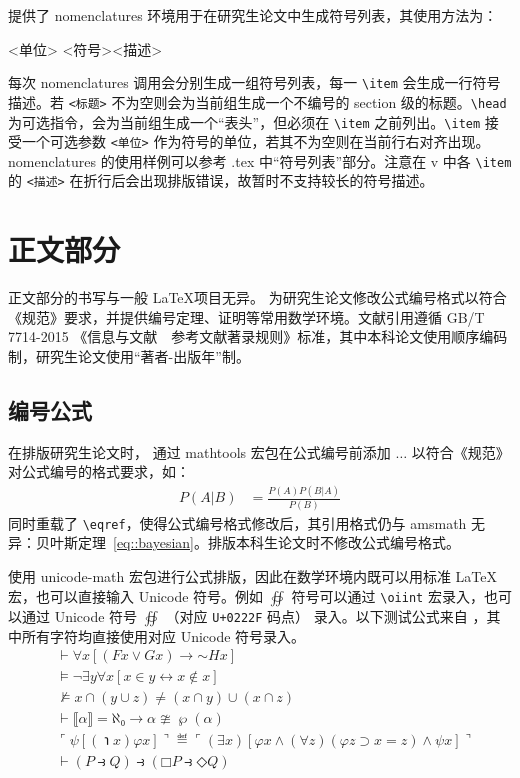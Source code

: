 \documentclass[master]{shtthesis}
\begin{document}
\shtthesis{} 提供了 nomenclatures 环境用于在研究生论文中生成符号列表，其使用方法为：
\begin{latex}
\begin{nomenclatures}[<标题>]
  \item[<单位>]{<符号>}{<描述>}
\end{nomenclatures}
\end{latex}
每次 nomenclatures 调用会分别生成一组符号列表，每一 \verb|\item| 会生成一行符号描述。若 \verb|<标题>| 不为空则会为当前组生成一个不编号的 section 级的标题。\verb|\head| 为可选指令，会为当前组生成一个“表头”，但必须在 \verb|\item| 之前列出。\verb|\item| 接受一个可选参数 \verb|<单位>| 作为符号的单位，若其不为空则在当前行右对齐出现。nomenclatures 的使用样例可以参考 \jobname.tex 中“符号列表”部分。注意在 \shtthesis{} v\version{} 中各 \verb|\item| 的 \verb|<描述>| 在折行后会出现排版错误，故暂时不支持较长的符号描述。

\section{正文部分}
\shtthesis{} 正文部分的书写与一般 \LaTeX 项目无异。\shtthesis{} 为研究生论文修改公式编号格式以符合《规范》要求，并提供编号定理、证明等常用数学环境。文献引用遵循 GB/T 7714-2015 《信息与文献　参考文献著录规则》标准，其中本科论文使用顺序编码制，研究生论文使用“著者-出版年”制。

\subsection{编号公式}
在排版研究生论文时，\shtthesis{} 通过 \textsf{mathtools} 宏包在公式编号前添加 $\ldots$ 以符合《规范》对公式编号的格式要求，如：
\begin{align}
P(A|B) &= \frac{P(A)P(B|A)}{P(B)} \label{eq::bayesian}
\end{align}
同时重载了 \verb|\eqref|，使得公式编号格式修改后，其引用格式仍与 \textsf{amsmath} 无异：贝叶斯定理~\eqref{eq::bayesian}。排版本科生论文时不修改公式编号格式。

\shtthesis{} 使用 \textsf{unicode-math} 宏包进行公式排版，因此在数学环境内既可以用标准 \LaTeX{} 宏，也可以直接输入 Unicode 符号。例如 $\oiint$ 符号可以通过 \verb|\oiint| 宏录入，也可以通过 Unicode 符号 $∯$ （对应 \verb|U+0222F| 码点） 录入。以下测试公式来自 \citet{clerkma2013unicode}，其中所有字符均直接使用对应 Unicode 符号录入。
\begin{align}
& ⊢ ∀x[(Fx ∨ Gx) → \mathord{∼}Hx] \\
& ⊨ ¬∃y∀x[x∈y ↔ x∉x]  \\
& ⊭ x ∩ (y ∪ z) ≠ (x ∩ y) ∪ (x ∩ z) \\
& ⊢ ⟦α⟧ = ℵ₀ → α ≇ ℘(α) \\
& ⌜ψ[(℩x)φx]⌝ ≝ ⌜(∃x)[φx ∧ (∀z)(φz ⊃ x=z) ∧ ψx]⌝ \\
& ⊢ (P ⥽ Q) ⥽ (□P ⥽ ◇Q)
\end{align}
\end{document}
